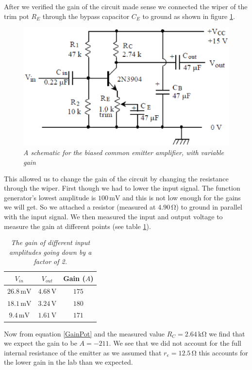 \documentclass[11pt]{article}
\numberwithin{equation}{section}
\numberwithin{figure}{section}
\numberwithin{table}{section}
\newcommand{\unit}[1]{\ensuremath{\, \mathrm{#1}}}
\begin{document}
After we verified the gain of the circuit made sense we connected the wiper of the trim pot $R_E$ through the bypass capacitor $C_E$ to ground as shown in figure \ref{EmitAmp2}.
\begin{figure}[h]
\centering
\includegraphics[scale=0.50]{EmitAmpSch2.eps}
\caption{\textit{A schematic for the biased common emitter amplifier, with variable gain}}
\label{EmitAmp2}
\end{figure}
 This allowed us to change the gain of the circuit by changing the resistance through the wiper. First though we had to lower the input signal. The function generator's lowest amplitude is $100\unit{mV}$ and this is not low enough for the gains we will get. So we attached a resistor (measured at $4.90\unit{\Omega}$) to ground in parallel with the input signal. We then measured the input and output voltage to measure the gain at different points (see table \ref{MaxGainTab}).
\begin{table}[h]
\centering
\begin{tabular}{ccc}
$V_{in}$	&$V_{out}$	&Gain ($A$)\\
\hline
$26.8\unit{mV}$	&$4.68\unit{V}$	&$175$\\
$18.1\unit{mV}$	&$3.24\unit{V}$	&$180$\\
$9.4\unit{mV}$	&$1.61\unit{V}$	&$171$\\
\end{tabular}
\caption{\textit{The gain of different input amplitudes going down by a factor of 2.}}
\label{MaxGainTab}
\end{table}
Now from equation \ref{GainPot} and the measured value $R_C=2.64\unit{k\Omega}$ we find that we expect the gain to be $A=-211$. We see that we did not account for the full internal resistance of the emitter as we assumed that $r_e=12.5\unit{\Omega}$ this accounts for the lower gain in the lab than we expected.
\end{document}
